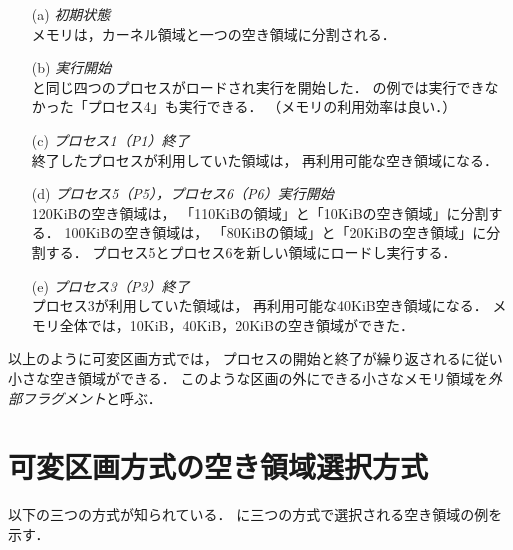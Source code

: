 \begin{enumerate}
\item[(a)] \emph{初期状態} \\
  メモリは，カーネル領域と一つの空き領域に分割される．
\item[(b)] \emph{実行開始} \\
  と同じ四つのプロセスがロードされ実行を開始した．
  の例では実行できなかった「プロセス4」も実行できる．
         （メモリの利用効率は良い．）
\item[(c)] \emph{プロセス1（P1）終了} \\
  終了したプロセスが利用していた領域は，
  再利用可能な空き領域になる．
\item[(d)] \emph{プロセス5（P5），プロセス6（P6）実行開始} \\
  120KiBの空き領域は，
  「110KiBの領域」と「10KiBの空き領域」に分割する．
  100KiBの空き領域は，
  「80KiBの領域」と「20KiBの空き領域」に分割する．
  プロセス5とプロセス6を新しい領域にロードし実行する．
\item[(e)] \emph{プロセス3（P3）終了} \\
  プロセス3が利用していた領域は，
  再利用可能な40KiB空き領域になる．
  メモリ全体では，10KiB，40KiB，20KiBの空き領域ができた．
\end{enumerate}

以上のように可変区画方式では，
プロセスの開始と終了が繰り返されるに従い小さな空き領域ができる．
このような区画の外にできる小さなメモリ領域を\emph{外部フラグメント}と呼ぶ．

\section{可変区画方式の空き領域選択方式}
以下の三つの方式が知られている．
に三つの方式で選択される空き領域の例を示す．

